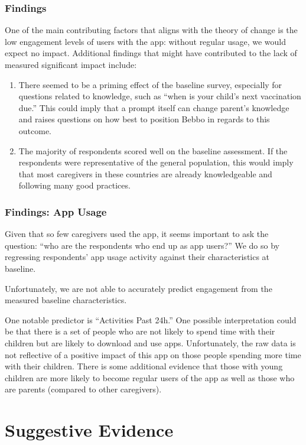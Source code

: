 \documentclass[aspectratio=169]{beamer}
\begin{document}
\begin{frame}
   \frametitle{Findings}
One of the main contributing factors that aligns with the theory of change is the low engagement levels of users with the app: without regular usage, we would expect no impact. Additional findings that might have contributed to the lack of measured significant impact include: 

  \begin{enumerate}
  \item There seemed to be a priming effect of the baseline survey, especially for questions related to knowledge, such as “when is your child’s next vaccination due.” This could imply that a prompt itself can change parent’s knowledge and raises questions on how best to position Bebbo in regards to this outcome. 
  \item The majority of respondents scored well on the baseline assessment. If the respondents were representative of the general population, this would imply that most caregivers in these countries are already knowledgeable and following many good practices.
  \end{enumerate}
    
\end{frame}

\begin{frame}
 \frametitle{Findings: App Usage}

Given that so few caregivers used the app, it seems important to ask the question: “who are the respondents who end up as app users?” We do so by regressing respondents’ app usage activity against their characteristics at baseline. 

Unfortunately, we are not able to accurately predict engagement from the measured baseline characteristics.

One notable predictor is ``Activities Past 24h.'' One possible interpretation could be that there is a set of people who are not likely to spend time with their children but are likely to download and use apps. Unfortunately, the raw data is not reflective of a positive impact of this app on those people spending more time with their children. There is some additional evidence that those with young children are more likely to become regular users of the app as well as those who are parents (compared to other caregivers). 
\end{frame}

\section{Suggestive Evidence}
\end{document}
